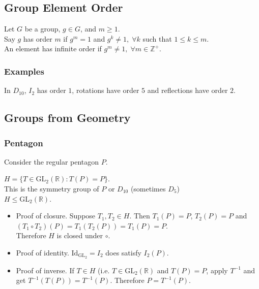 \documentclass[11pt]{article}
\newcommand{\0}{\emptyset}
\newcommand{\Z}{\mathbb{Z}}
\newcommand{\R}{\mathbb{R}}
\begin{document}
\subsection*{Group Element Order}
\label{sec:org0f3f59d}
Let \(G\) be a group, \(g\in G\), and \(m\geq 1\).\\[0pt]
Say \(g\) has order \(m\) if \(g^{m}=1\) and \(g^{k}\neq 1,\;\forall k\) such that \(1\leq k\leq m\).\\[0pt]
An element has infinite order if \(g^{m}\neq1,\;\forall m\in\Z^{+}\).\\[0pt]
\subsubsection*{Examples}
\label{sec:org903f514}
In \(D_{10}\), \(I_{2}\) has order \(1\), rotations have order \(5\) and reflections have order \(2\).\\[0pt]
\subsection*{Groups from Geometry}
\label{sec:org3b9cce8}
\subsubsection*{Pentagon}
\label{sec:orgcd6486b}
Consider the regular pentagon \(P\).\\[0pt]


\(H=\{T\in\text{GL}_{2}(\R):T(P)=P\}\).\\[0pt]
This is the symmetry group of \(P\) or \(D_{10}\) (sometimes \(D_{5}\))\\[0pt]
\(H\leq\text{GL}_{2}(\R)\).\\[0pt]
\begin{itemize}
\item Proof of closure.
\label{sec:orga1a44ab}
Suppose \(T_{1},T_{2}\in H\). Then \(T_{1}(P)=P\), \(T_{2}(P)=P\) and \((T_{1}\circ T_{2})(P)=T_{1}(T_{2}(P))=T_{1}(P)=P\).\\[0pt]
Therefore \(H\) is closed under \(\circ\).\\[0pt]
\item Proof of identity.
\label{sec:orgaa38239}
\(\text{Id}_{\text{GL}_{2}}=I_{2}\) does satisfy \(I_{2}(P)\).\\[0pt]
\item Proof of inverse.
\label{sec:orgf1e1540}
If \(T\in H\) (i.e. \(T\in\text{GL}_{2}(\R)\) and \(T(P)=P\), apply \(T^{-1}\) and get \(T^{-1}(T(P))=T^{-1}(P)\). Therefore \(P=T^{-1}(P)\).\\[0pt]
\end{itemize}
\end{document}

